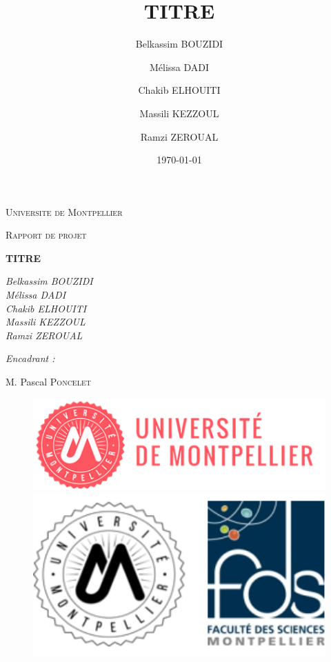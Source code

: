 \documentclass[oneside,13pt,a4paper]{report}
\title{TITRE}
\author{
    Belkassim BOUZIDI \and
    Mélissa DADI  \and
    Chakib ELHOUITI \and
    Massili KEZZOUL \and
    Ramzi ZEROUAL
}
\date{\today}
\begin{document}
\begin{titlepage}
	\centering
	{\scshape\LARGE Universite de Montpellier\par}
	{\scshape\Large Rapport de projet\par}
	\vspace{1.5cm}
	{\huge\bfseries TITRE\par}
	\vspace{2cm}
	{\Large\itshape
		Belkassim BOUZIDI \\
    	Mélissa DADI \\
		Chakib ELHOUITI \\
		Massili KEZZOUL \\
		Ramzi ZEROUAL \\
		\par}

	\vspace{1.5cm}

	{\Large\itshape
		Encadrant :\par
		M. Pascal \textsc{Poncelet}
		\par}

	\vspace{2cm}

	\begin{figure}[h]
		\begin{minipage}[c]{.46\linewidth}
			\centering
			\includegraphics[width=1\textwidth]{img/univ-montpellier.png}
		\end{minipage}
		\hfill%
		\begin{minipage}[c]{.46\linewidth}
			\centering
			\includegraphics[width=1\textwidth]{img/fds.png}
		\end{minipage}
	\end{figure}


\end{titlepage}
\end{document}
